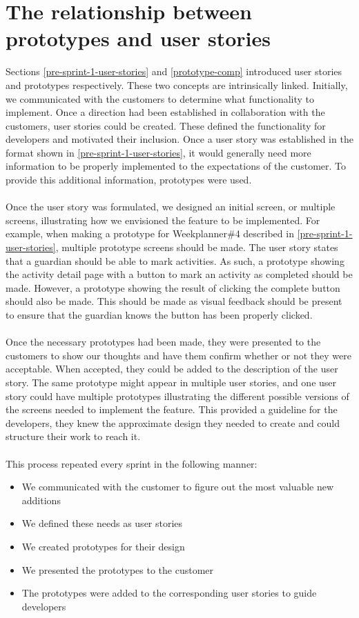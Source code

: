 \section{The relationship between prototypes and user stories}
Sections \ref{pre-sprint-1-user-stories} and \ref{prototype-comp} introduced user stories and prototypes respectively.
These two concepts are intrinsically linked.
Initially, we communicated with the customers to determine what functionality to implement. 
Once a direction had been established in collaboration with the customers, user stories could be created.
These defined the functionality for developers and motivated their inclusion.
Once a user story was established in the format shown in \autoref{pre-sprint-1-user-stories}, it would generally need more information to be properly implemented to the expectations of the customer.
To provide this additional information, prototypes were used.
\\\\
Once the user story was formulated, we designed an initial screen, or multiple screens, illustrating how we envisioned the feature to be implemented.
For example, when making a prototype for Weekplanner\#4 described in \autoref{pre-sprint-1-user-stories}, multiple prototype screens should be made.
The user story states that a guardian should be able to mark activities. 
As such, a prototype showing the activity detail page with a button to mark an activity as completed should be made.
However, a prototype showing the result of clicking the complete button should also be made.
This should be made as visual feedback should be present to ensure that the guardian knows the button has been properly clicked.
\\\\
Once the necessary prototypes had been made, they were presented to the customers to show our thoughts and have them confirm whether or not they were acceptable.
When accepted, they could be added to the description of the user story.
The same prototype might appear in multiple user stories, and one user story could have multiple prototypes illustrating the different possible versions of the screens needed to implement the feature.
This provided a guideline for the developers, they knew the approximate design they needed to create and could structure their work to reach it.
\\\\
This process repeated every sprint in the following manner:
\begin{itemize}
    \item We communicated with the customer to figure out the most valuable new additions
    \item We defined these needs as user stories
    \item We created prototypes for their design
    \item We presented the prototypes to the customer
    \item The prototypes were added to the corresponding user stories to guide developers
\end{itemize}
